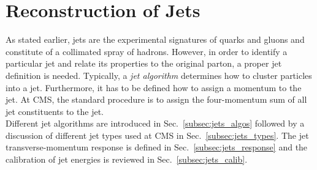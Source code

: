 \section{Reconstruction of Jets}
\label{sec:jets_reco}
As stated earlier, jets are the experimental signatures of quarks and gluons and constitute of a collimated spray of hadrons. However, in order to identify a particular jet and relate its properties to the original parton, a proper jet definition is needed. Typically, a \textit{jet algorithm} determines how to cluster particles into a jet. Furthermore, it has to be defined how to assign a momentum to the jet. At CMS, the standard procedure is to assign the four-momentum sum of all jet constituents to the jet. \\
Different jet algorithms are introduced in Sec.~\ref{subsec:jets_algos} followed by a discussion of different jet types used at CMS in Sec.~\ref{subsec:jets_types}. The jet transverse-momentum response is defined in Sec.~\ref{subsec:jets_response} and the calibration of jet energies is reviewed in Sec.~\ref{subsec:jets_calib}.

